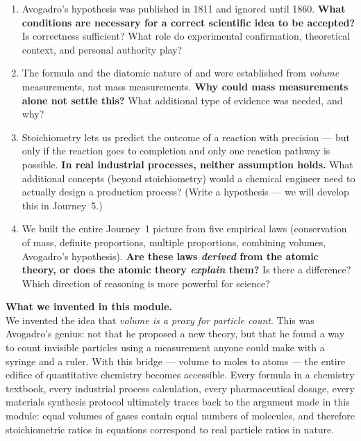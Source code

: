 \documentclass[12pt, a4paper]{book}
\theoremstyle{definition}
\begin{document}
\begin{reflectionbox}
\begin{enumerate}[label=\textbf{R\arabic*.}]
  \item Avogadro's hypothesis was published in 1811 and ignored
        until 1860.
        \textbf{What conditions are necessary for a correct
        scientific idea to be accepted?}
        Is correctness sufficient?
        What role do experimental confirmation,
        theoretical context, and personal authority play?

  \item The formula  and the diatomic nature of 
        and  were established from \emph{volume} measurements,
        not mass measurements.
        \textbf{Why could mass measurements alone not settle this?}
        What additional type of evidence was needed, and why?

  \item Stoichiometry lets us predict the outcome of a reaction
        with precision --- but only if the reaction goes to completion
        and only one reaction pathway is possible.
        \textbf{In real industrial processes, neither assumption holds.}
        What additional concepts (beyond stoichiometry) would a
        chemical engineer need to actually design a production process?
        (Write a hypothesis --- we will develop this in Journey~5.)

  \item We built the entire Journey~1 picture from five
        empirical laws (conservation of mass, definite proportions,
        multiple proportions, combining volumes, Avogadro's hypothesis).
        \textbf{Are these laws \emph{derived} from the atomic theory,
        or does the atomic theory \emph{explain} them?}
        Is there a difference?
        Which direction of reasoning is more powerful for science?
\end{enumerate}
\end{reflectionbox}

\vspace{1.5em}
\begin{center}
\begin{tcolorbox}[
  enhanced, colback=DiscoveryColor!8, colframe=DiscoveryColor,
  width=0.88\textwidth, arc=3pt
]
\centering\sffamily\small
\textbf{What we invented in this module.}\\[4pt]
We invented the idea that \emph{volume is a proxy for particle count}.
This was Avogadro's genius: not that he proposed a new theory,
but that he found a way to count invisible particles
using a measurement anyone could make with a syringe and a ruler.
With this bridge --- volume to moles to atoms ---
the entire edifice of quantitative chemistry becomes accessible.
Every formula in a chemistry textbook, every industrial process calculation,
every pharmaceutical dosage, every materials synthesis protocol
ultimately traces back to the argument made in this module:
equal volumes of gases contain equal numbers of molecules,
and therefore stoichiometric ratios in equations
correspond to real particle ratios in nature.
\end{tcolorbox}
\end{center}
\end{document}

